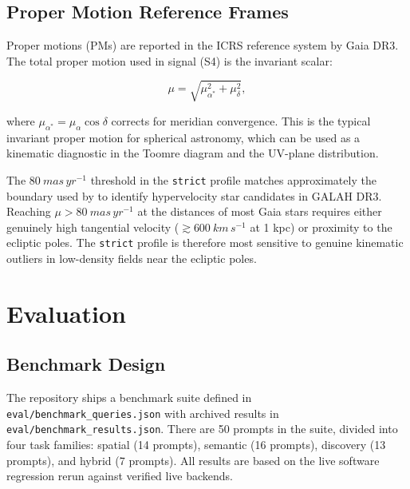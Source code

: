 \documentclass[preprint,12pt,authoryear]{elsarticle}
\begin{document}
\subsection{Proper Motion Reference Frames}
\label{sec:pm}

Proper motions (PMs) are reported in the ICRS reference system by Gaia DR3. The total proper motion used in signal (S4) is the invariant scalar:

\begin{equation}
\mu = \sqrt{\mu_{\alpha^*}^2 + \mu_\delta^2},
\label{eq:pm}
\end{equation}

where $\mu_{\alpha^*} = \mu_\alpha \cos\delta$ corrects for meridian convergence. This is the typical invariant proper motion for spherical astronomy, which can be used as a kinematic diagnostic in the Toomre diagram and the UV-plane distribution.

The $\SI{80}{mas\,yr^{-1}}$ threshold in the \texttt{strict} profile matches approximately the boundary used by \citet{Brown2015} to identify hypervelocity star candidates in GALAH DR3. Reaching $\mu > \SI{80}{mas\,yr^{-1}}$ at the distances of most Gaia stars requires either genuinely high tangential velocity ($\gtrsim \SI{600}{km\,s^{-1}}$ at 1 kpc) or proximity to the ecliptic poles. The \texttt{strict} profile is therefore most sensitive to genuine kinematic outliers in low-density fields near the ecliptic poles.

\section{Evaluation}
\label{sec:evaluation}

\subsection{Benchmark Design}
\label{sec:benchmark_design}

The repository ships a benchmark suite defined in \texttt{eval/benchmark\_queries.json} with archived results in \texttt{eval/benchmark\_results.json}. There are 50 prompts in the suite, divided into four task families: spatial (14 prompts), semantic (16 prompts), discovery (13 prompts), and hybrid (7 prompts). All results are based on the live software regression rerun against verified live backends.
\end{document}
